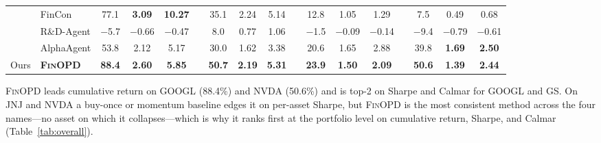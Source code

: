 \begin{table}[t]
\begin{threeparttable}
{\begin{tabular}{clccccccccccccccc}
& FinCon & 77.1 & \textbf{\textcolor{FBest}{3.09}} & \textbf{\textcolor{FBest}{10.27}} && 35.1 & 2.24 & 5.14 && 12.8 & 1.05 & 1.29 && 7.5 & 0.49 & 0.68 \\
& R\&D-Agent & $-$5.7 & $-$0.66 & $-$0.47 && 8.0 & 0.77 & 1.06 && $-$1.5 & $-$0.09 & $-$0.14 && $-$9.4 & $-$0.79 & $-$0.61 \\
& AlphaAgent & 53.8 & 2.12 & 5.17 && 30.0 & 1.62 & 3.38 && 20.6 & 1.65 & 2.88 && 39.8 & \textbf{\textcolor{FBest}{1.69}} & \textbf{\textcolor{FBest}{2.50}} \\
\midrule
\multirow{1}{*}{Ours}
& \textbf{\textsc{FinOPD}} & \textbf{\textcolor{FBest}{88.4}} & \textbf{2.60} & \textbf{5.85} && \textbf{50.7} & \textbf{2.19} & \textbf{5.31} && \textbf{23.9} & \textbf{1.50} & \textbf{2.09} && \textbf{\textcolor{FBest}{50.6}} & \textbf{1.39} & \textbf{2.44} \\
\bottomrule
\end{tabular}
}
\begin{tablenotes}
\footnotesize
\item \textsc{FinOPD} leads cumulative return on GOOGL (88.4\%) and NVDA (50.6\%) and is top-2 on Sharpe and Calmar for GOOGL and GS. On JNJ and NVDA a buy-once or momentum baseline edges it on per-asset Sharpe, but \textsc{FinOPD} is the most consistent method across the four names---no asset on which it collapses---which is why it ranks first at the portfolio level on cumulative return, Sharpe, and Calmar (Table~\ref{tab:overall}).
\end{tablenotes}
\end{threeparttable}
\label{tab:per_asset}
\end{table}
